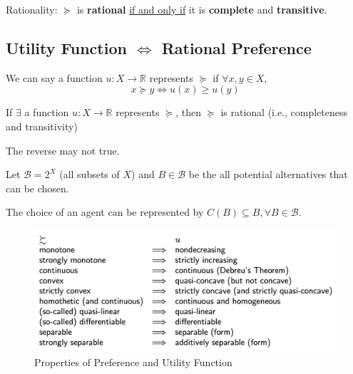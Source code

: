 \documentclass[11pt]{elegantbook}
\begin{document}
\begin{definition}
    \normalfont
    {Rationality}: $\succeq$ is \textbf{rational} \underline{if and only if} it is \textbf{complete} and \textbf{transitive}.
\end{definition}

\subsection{Utility Function $\Leftrightarrow$ Rational Preference}
\begin{definition}
    \normalfont
    We can say a function $u: X \rightarrow \mathbb{R}$ represents $\succeq$ if $\forall x,y\in X$, $$x\succeq y \Leftrightarrow u(x)\geq u(y)$$
\end{definition}

\begin{proposition}
    If $\exists$ a function $u: X \rightarrow \mathbb{R}$ represents $\succeq$, then $\succeq$ is rational (i.e., completeness and transitivity)
\end{proposition}
\begin{note}
    The reverse may not true.
\end{note}

Let $\mathcal{B}=2^X$ (all subsets of $X$) and $B\in \mathcal{B}$ be the all potential alternatives that can be chosen.

The choice of an agent can be represented by $C(B)\subseteq B, \forall B\in \mathcal{B}$.

\begin{center}\begin{figure}[htbp]
    \centering
    \includegraphics[scale=0.2]{Pref_prop.png}
    \caption{Properties of Preference and Utility Function}
    \label{}
\end{figure}\end{center}
\end{document}
